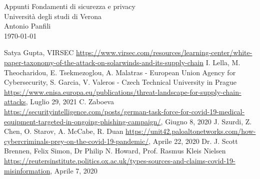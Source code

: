 \documentclass[12pt, a4paper]{article}
\begin{document}
\begin{titlepage}
    \centering
    \vfill
    \vspace*{4cm}
    \Huge Appunti Fondamenti di sicurezza e privacy\\
    \vspace*{1cm}
    \large Università degli studi di Verona\\
    \vspace*{4cm}
    \normalsize Antonio Panfili\\
    \vspace*{7cm}
    \footnotesize \today
    \vfill
\end{titlepage}
\newpage

\tableofcontents
\newpage












\newpage



\newpage
\printglossary[type=\acronymtype]

\listoffigures

\listoftables

\begin{thebibliography}{00}
 Satya Gupta, VIRSEC \url{https://www.virsec.com/resources/learning-center/white-paper-taxonomy-of-the-attack-on-solarwinds-and-its-supply-chain}
 I. Lella, M. Theocharidou, E. Tsekmezoglou, A. Malatras - European Union Agency for Cybersecurity, S. Garcia, V. Valeros - Czech Technical University in Prague \url{https://www.enisa.europa.eu/publications/threat-landscape-for-supply-chain-attacks}, Luglio 29, 2021
 C. Zaboeva  \url{https://securityintelligence.com/posts/german-task-force-for-covid-19-medical-equipment-targeted-in-ongoing-phishing-campaign/}, Giugno 8, 2020
 J. Szurdi, Z. Chen, O. Starov, A. McCabe, R. Duan \url{https://unit42.paloaltonetworks.com/how-cybercriminals-prey-on-the-covid-19-pandemic/}, Aprile 22, 2020
 Dr. J. Scott Brennen, Felix Simon, Dr Philip N. Howard, Prof. Rasmus Kleis Nielsen \url{https://reutersinstitute.politics.ox.ac.uk/types-sources-and-claims-covid-19-misinformation}, Aprile 7, 2020
\end{thebibliography}
\end{document}
